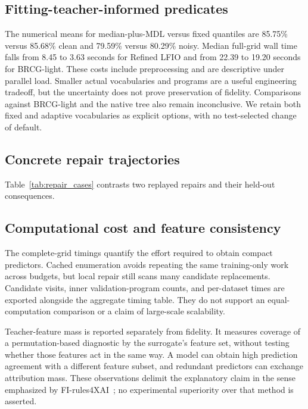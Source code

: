 \documentclass[a4paper,fleqn,review]{cas-sc}
\newcommand{\kbsbarrier}{\FloatBarrier}
\newcommand{\kbsbarrier}{}
\begin{document}
\subsection{Fitting-teacher-informed predicates}\label{sec:mdl-results}



The numerical means for median-plus-MDL versus fixed quantiles are 85.75\% versus 85.68\% clean and 79.59\% versus 80.29\% noisy. Median full-grid wall time falls from 8.45 to 3.63 seconds for Refined LFIO and from 22.39 to 19.20 seconds for BRCG-light. These costs include preprocessing and are descriptive under parallel load. Smaller actual vocabularies and programs are a useful engineering tradeoff, but the uncertainty does not prove preservation of fidelity. Comparisons against BRCG-light and the native tree also remain inconclusive. We retain both fixed and adaptive vocabularies as explicit options, with no test-selected change of default.

\subsection{Concrete repair trajectories}\label{sec:cases}
Table~\ref{tab:repair_cases} contrasts two replayed repairs and their held-out consequences.



\subsection{Computational cost and feature consistency}


The complete-grid timings quantify the effort required to obtain compact predictors. Cached enumeration avoids repeating the same training-only work across budgets, but local repair still scans many candidate replacements. Candidate visits, inner validation-program counts, and per-dataset times are exported alongside the aggregate timing table. They do not support an equal-computation comparison or a claim of large-scale scalability.

Teacher-feature mass is reported separately from fidelity. It measures coverage of a permutation-based diagnostic by the surrogate's feature set, without testing whether those features act in the same way. A model can obtain high prediction agreement with a different feature subset, and redundant predictors can exchange attribution mass. These observations delimit the explanatory claim in the sense emphasized by FI-rules4XAI~\citep{kozielski2025}; no experimental superiority over that method is asserted.
\kbsbarrier
\end{document}
